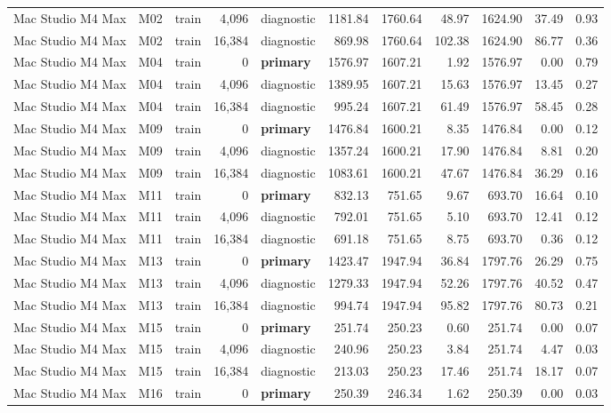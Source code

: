 \documentclass[10pt]{article}
\begin{document}
\begin{landscape}
\begin{longtable}{@{}l l l r l r r r r r r@{}}
Mac Studio M4 Max & M02 & train & 4,096 & diagnostic & 1181.84 & 1760.64 & 48.97 & 1624.90 & 37.49 & 0.93 \\
Mac Studio M4 Max & M02 & train & 16,384 & diagnostic & 869.98 & 1760.64 & 102.38 & 1624.90 & 86.77 & 0.36 \\
Mac Studio M4 Max & M04 & train & 0 & \textbf{primary} & 1576.97 & 1607.21 & 1.92 & 1576.97 & 0.00 & 0.79 \\
Mac Studio M4 Max & M04 & train & 4,096 & diagnostic & 1389.95 & 1607.21 & 15.63 & 1576.97 & 13.45 & 0.27 \\
Mac Studio M4 Max & M04 & train & 16,384 & diagnostic & 995.24 & 1607.21 & 61.49 & 1576.97 & 58.45 & 0.28 \\
Mac Studio M4 Max & M09 & train & 0 & \textbf{primary} & 1476.84 & 1600.21 & 8.35 & 1476.84 & 0.00 & 0.12 \\
Mac Studio M4 Max & M09 & train & 4,096 & diagnostic & 1357.24 & 1600.21 & 17.90 & 1476.84 & 8.81 & 0.20 \\
Mac Studio M4 Max & M09 & train & 16,384 & diagnostic & 1083.61 & 1600.21 & 47.67 & 1476.84 & 36.29 & 0.16 \\
Mac Studio M4 Max & M11 & train & 0 & \textbf{primary} & 832.13 & 751.65 & 9.67 & 693.70 & 16.64 & 0.10 \\
Mac Studio M4 Max & M11 & train & 4,096 & diagnostic & 792.01 & 751.65 & 5.10 & 693.70 & 12.41 & 0.12 \\
Mac Studio M4 Max & M11 & train & 16,384 & diagnostic & 691.18 & 751.65 & 8.75 & 693.70 & 0.36 & 0.12 \\
Mac Studio M4 Max & M13 & train & 0 & \textbf{primary} & 1423.47 & 1947.94 & 36.84 & 1797.76 & 26.29 & 0.75 \\
Mac Studio M4 Max & M13 & train & 4,096 & diagnostic & 1279.33 & 1947.94 & 52.26 & 1797.76 & 40.52 & 0.47 \\
Mac Studio M4 Max & M13 & train & 16,384 & diagnostic & 994.74 & 1947.94 & 95.82 & 1797.76 & 80.73 & 0.21 \\
Mac Studio M4 Max & M15 & train & 0 & \textbf{primary} & 251.74 & 250.23 & 0.60 & 251.74 & 0.00 & 0.07 \\
Mac Studio M4 Max & M15 & train & 4,096 & diagnostic & 240.96 & 250.23 & 3.84 & 251.74 & 4.47 & 0.03 \\
Mac Studio M4 Max & M15 & train & 16,384 & diagnostic & 213.03 & 250.23 & 17.46 & 251.74 & 18.17 & 0.07 \\
Mac Studio M4 Max & M16 & train & 0 & \textbf{primary} & 250.39 & 246.34 & 1.62 & 250.39 & 0.00 & 0.03 \\

\end{longtable}
\end{landscape}
\end{document}
